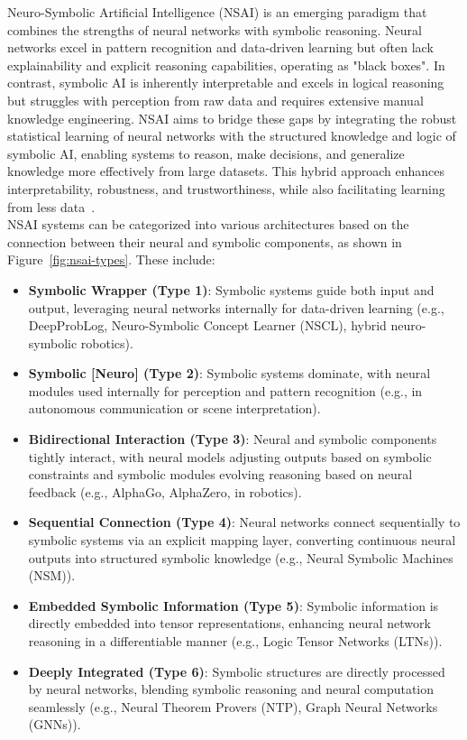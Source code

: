 \documentclass[12pt]{extarticle}
\begin{document}
Neuro-Symbolic Artificial Intelligence (NSAI) is an emerging paradigm that combines the strengths of neural networks with symbolic reasoning. Neural networks excel in pattern recognition and data-driven learning but often lack explainability and explicit reasoning capabilities, operating as "black boxes". In contrast, symbolic AI is inherently interpretable and excels in logical reasoning but struggles with perception from raw data and requires extensive manual knowledge engineering. NSAI aims to bridge these gaps by integrating the robust statistical learning of neural networks with the structured knowledge and logic of symbolic AI, enabling systems to reason, make decisions, and generalize knowledge more effectively from large datasets. This hybrid approach enhances interpretability, robustness, and trustworthiness, while also facilitating learning from less data~\cite{nsai}.\\
NSAI systems can be categorized into various architectures based on the connection between their neural and symbolic components, as shown in Figure~\ref{fig:nsai-types}. These include:
\begin{itemize}

    \item \textbf{Symbolic Wrapper (Type 1)}: Symbolic systems guide both input and output, leveraging neural networks internally for data-driven learning (e.g., DeepProbLog, Neuro-Symbolic Concept Learner (NSCL), hybrid neuro-symbolic robotics).

    \item \textbf{Symbolic [Neuro] (Type 2)}: Symbolic systems dominate, with neural modules used internally for perception and pattern recognition (e.g., in autonomous communication or scene interpretation).

    \item \textbf{Bidirectional Interaction (Type 3)}: Neural and symbolic components tightly interact, with neural models adjusting outputs based on symbolic constraints and symbolic modules evolving reasoning based on neural feedback (e.g., AlphaGo, AlphaZero, in robotics).

    \item \textbf{Sequential Connection (Type 4)}: Neural networks connect sequentially to symbolic systems via an explicit mapping layer, converting continuous neural outputs into structured symbolic knowledge (e.g., Neural Symbolic Machines (NSM)).

    \item \textbf{Embedded Symbolic Information (Type 5)}: Symbolic information is directly embedded into tensor representations, enhancing neural network reasoning in a differentiable manner (e.g., Logic Tensor Networks (LTNs)).

    \item \textbf{Deeply Integrated (Type 6)}: Symbolic structures are directly processed by neural networks, blending symbolic reasoning and neural computation seamlessly (e.g., Neural Theorem Provers (NTP), Graph Neural Networks (GNNs)).
\end{itemize}
\end{document}
